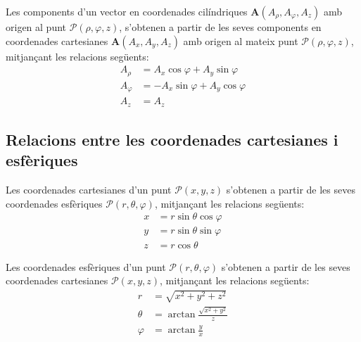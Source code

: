 \documentclass[catalan,a4paper,twoside,11pt]{article}
\begin{document}
Les components d'un vector en coordenades cilíndriques $\boldsymbol{A}(A_\rho, A_\varphi, A_z)$ amb origen al punt $\mathscr{P}(\rho,\varphi,z)$, s'obtenen a partir de les seves components en coordenades cartesianes $\boldsymbol{A}(A_x, A_y, A_z)$ amb origen al mateix punt $\mathscr{P}(\rho,\varphi,z)$, mitjançant les relacions següents:
\begin{subequations}\begin{align}
    A_\rho &=  A_x\cos\varphi+A_y\sin\varphi\\
    A_\varphi &= -A_x\sin\varphi+A_y\cos\varphi \\
    A_z &= A_z
\end{align}\end{subequations}


\subsection{Relacions entre les coordenades cartesianes i
esfèriques}

Les coordenades cartesianes  d'un punt $\mathscr{P}(x,y,z)$ s'obtenen a partir
de les seves coordenades esfèriques $\mathscr{P}(r,\theta,\varphi)$,
mitjançant les relacions següents:
\begin{subequations}\begin{align}
    x &=r\sin\theta\cos\varphi \\ y &=r\sin\theta\sin\varphi \\ z &=r\cos\theta
\end{align}\end{subequations}

Les coordenades  esfèriques  d'un punt $\mathscr{P}(r,\theta,\varphi)$
s'obtenen a partir de les seves coordenades cartesianes $\mathscr{P}(x,y,z)$,
mitjançant les relacions següents:
\begin{subequations}\begin{align}
    r &=\sqrt{x^2+y^2+z^2}\\
    \theta&=\arctan{\frac{\sqrt{x^2+y^2}}{z}}\\[1mm]
    \varphi &=\arctan\frac{y}{x}
\end{align}\end{subequations}
\end{document}
